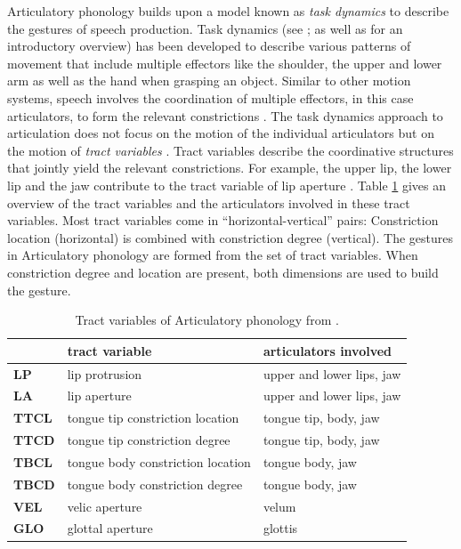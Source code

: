 Articulatory phonology builds upon a model known as \emph{task dynamics} to describe the gestures of speech production. Task dynamics (see \citealp{Saltzman1986, SaltzmanKelso1987, Saltzman1991}; as well as \citealp{Hawkins1992} for an introductory overview) has been developed to describe various patterns of movement that include multiple effectors like the shoulder, the upper and lower arm as well as the hand when grasping an object. Similar to other motion systems, speech involves the coordination of multiple effectors, in this case articulators, to form the relevant constrictions \citep{BrowmanGoldstein1989}. The task dynamics approach to articulation does not focus on the motion of the individual articulators but on the motion of \emph{tract variables} \citep{BrowmanGoldstein1992}. Tract variables describe the coordinative structures that jointly yield the relevant constrictions. For example, the upper lip, the lower lip and the jaw contribute to the tract variable of lip aperture \citep{BrowmanGoldstein1992}. Table \ref{tab:tract_vars} gives an overview of the tract variables and the articulators involved in these tract variables. Most tract variables come in “horizontal-vertical” pairs: Constriction location (horizontal) is combined with constriction degree (vertical). The gestures in Articulatory phonology are formed from the set of tract variables. When constriction degree and location are present, both dimensions are used to build the gesture.

\begin{table}[htp]
\caption{Tract variables of Articulatory phonology from \citet[73]{BrowmanGoldstein1989}.}
\begin{center}
\begin{tabular}{lll}
&			\textbf{tract variable} &			\textbf{articulators involved}\\
\hline
\textbf{LP} &		lip protrusion &				upper and lower lips, jaw\\
\textbf{LA} &		lip aperture &				upper and lower lips, jaw\\
\textbf{TTCL} &	tongue tip constriction location &	tongue tip, body, jaw \\
\textbf{TTCD} &	tongue tip constriction degree &		tongue tip, body, jaw \\
\textbf{TBCL} &	tongue body constriction location &	tongue body, jaw \\
\textbf{TBCD} &	tongue body constriction degree &	tongue body, jaw \\
\textbf{VEL} &	velic aperture &				velum \\
\textbf{GLO} &	glottal aperture &				glottis \\
\end{tabular}
\end{center}
\label{tab:tract_vars}
\end{table}%

